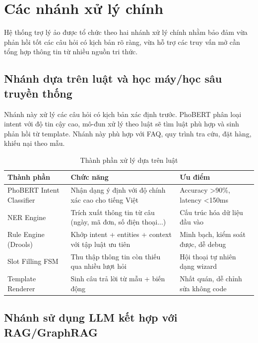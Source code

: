 \section{Các nhánh xử lý chính}

Hệ thống trợ lý ảo được tổ chức theo hai nhánh xử lý chính nhằm bảo đảm vừa phản hồi tốt các câu hỏi có kịch bản rõ ràng, vừa hỗ trợ các truy vấn mở cần tổng hợp thông tin từ nhiều nguồn tri thức.

\subsection{Nhánh dựa trên luật và học máy/học sâu truyền thống}

Nhánh này xử lý các câu hỏi có kịch bản xác định trước. PhoBERT phân loại intent với độ tin cậy cao, mô-đun xử lý theo luật sẽ tìm luật phù hợp và sinh phản hồi từ template. Nhánh này phù hợp với FAQ, quy trình tra cứu, đặt hàng, khiếu nại theo mẫu.

\begin{table}[H]
    \centering
    \caption{Thành phần xử lý dựa trên luật}
    \label{tab:rule_based_components}
    \begin{tabularx}{\textwidth}{|>{\raggedright\arraybackslash}p{}|>{\raggedright\arraybackslash}X|>{\raggedright\arraybackslash}p{}|}
        \hline
        \textbf{Thành phần} & \textbf{Chức năng} & \textbf{Ưu điểm} \\
        \hline
        PhoBERT Intent Classifier & Nhận dạng ý định với độ chính xác cao cho tiếng Việt & Accuracy >90\%, latency <150ms \\
        \hline
        NER Engine & Trích xuất thông tin từ câu (ngày, mã đơn, số điện thoại...) & Cấu trúc hóa dữ liệu đầu vào \\
        \hline
        Rule Engine (Drools) & Khớp intent + entities + context với tập luật ưu tiên & Minh bạch, kiểm soát được, dễ debug \\
        \hline
        Slot Filling FSM & Thu thập thông tin còn thiếu qua nhiều lượt hỏi & Hội thoại tự nhiên dạng wizard \\
        \hline
        Template Renderer & Sinh câu trả lời từ mẫu + biến động & Nhất quán, dễ chỉnh sửa không code \\
        \hline
    \end{tabularx}
\end{table}

\subsection{Nhánh sử dụng LLM kết hợp với RAG/GraphRAG}

